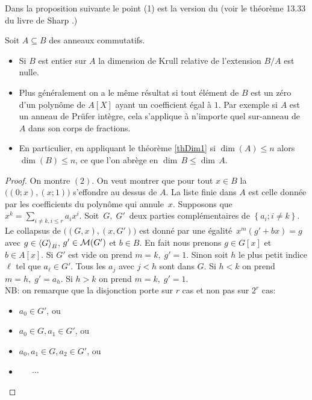 Dans la proposition suivante le point (1) est la version \cov du 
 (voir le théorème
13.33 du livre de Sharp \cite{Sha}.)

\begin{proposition} 
\label{propDim2}  Soit $A\subseteq B$ des anneaux commutatifs. 
\begin{itemize}
\item [$(1)$] Si $B$  est entier sur $A$ la dimension de Krull relative de 
l'extension $B/A$  est nulle.
\item [$(2)$] Plus généralement on a le même résultat si tout 
élément de $B$ est un zéro d'un polynôme de $A[X]$ ayant un 
coefficient égal à $1$. Par exemple si $A$ est un 
anneau de Prüfer intègre, cela s'applique à n'importe quel 
sur-anneau de $A$ dans son corps de fractions.
\item [$(3)$] En particulier, en appliquant le théorème 
\ref{thDim1}
si  $\dim(A)\leq n$ alors $\dim(B)\leq n$, ce que l'on abrège en $\dim \,B\leq \dim\,A$.   
\end{itemize}
\end{proposition}
\begin{proof}
On montre $(2)$. On veut montrer que pour tout $x\in B$ la \proc
$\big((0;x),(x;1)\big)$ s'effondre au dessus de $A$. 
La liste finie dans $A$ est celle donnée par les coefficients du 
polynôme qui annule~$x$. Supposons que
$x^k=\sum_{i\neq k,i\leq r}a_ix^i$. 
Soit  $\,G,\; G'\,$ deux parties complémentaires de
$\left\{a_i;i\neq k\right\}$. 
Le collapsus de $\big((G,x),(x,G')\big)$ est donné par une égalité 
$\,x^m(g'+bx)=g\,$ avec $g\in \left\langle{G}\right\rangle_B$, \hbox{$g'\in {\cal M}(G')$} et $b\in B$. 
En fait nous prenons $g\in G[x]$ et $b\in A[x]$. 
Si $G'$ est vide on prend $m=k,\; g'=1$. 
Sinon soit $h$  le plus petit indice $\ell$ tel que $a_\ell\in G'$. 
Tous les $a_j$ avec $j<h$ sont dans $G$. Si $h<k$ on prend $m=h,\; 
g'=a_h$.  Si $h>k$ on prend $m=k,\; g'=1$. \\
NB: on remarque que la disjonction porte sur  $r$ cas et non pas sur 
$2^r$ cas:
\begin{itemize}
\item $ a_0\in G'$, ou
\item $  a_0\in G,a_1\in G'$, ou
\item $  a_0,a_1\in G,a_2\in G'$, ou
\item $~~~~~~~\cdots$
\end{itemize}
\end{proof}

